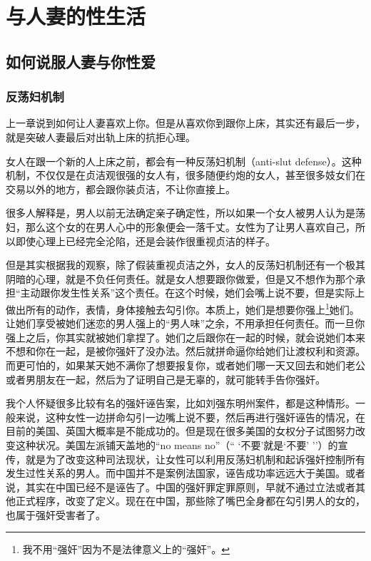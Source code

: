 \chapter{与人妻的性生活}

\section{如何说服人妻与你性爱}

\subsection{反荡妇机制}

上一章说到如何让人妻喜欢上你。但是从喜欢你到跟你上床，其实还有最后一步，就是突破人妻最后对出轨上床的抗拒心理。

女人在跟一个新的人上床之前，都会有一种反荡妇机制（anti-slut defense）。这种机制，不仅仅是在贞洁观很强的女人有，很多随便约炮的女人，甚至很多妓女们在交易以外的地方，都会跟你装贞洁，不让你直接上。

很多人解释是，男人以前无法确定亲子确定性，所以如果一个女人被男人认为是荡妇，那么这个女的在男人心中的形象便会一落千丈。女性为了让男人喜欢自己，所以即使心理上已经完全沦陷，还是会装作很重视贞洁的样子。

但是其实根据我的观察，除了假装重视贞洁之外，女人的反荡妇机制还有一个极其阴暗的心理，就是不负任何责任。就是女人想要跟你做爱，但是又不想作为那个承担``主动跟你发生性关系''这个责任。在这个时候，她们会嘴上说不要，但是实际上做出所有的动作，表情，身体接触去勾引你。本质上，她们是想要你强上\footnote{我不用``强奸''因为不是法律意义上的``强奸''。}她们。让她们享受被她们迷恋的男人强上的``男人味''之余，不用承担任何责任。而一旦你强上之后，你其实就被她们拿捏了。她们之后跟你在一起的时候，就会说她们本来不想和你在一起，是被你强奸了没办法。然后就拼命逼你给她们让渡权利和资源。而更可怕的，如果某天她不满你了想要报复你，或者她们哪一天又回去和她们老公或者男朋友在一起，然后为了证明自己是无辜的，就可能转手告你强奸。

我个人怀疑很多比较有名的强奸诬告案，比如刘强东明州案件，都是这种情形。一般来说，这种女性一边拼命勾引一边嘴上说不要，然后再进行强奸诬告的情况，在目前的美国、英国大概率是不能成功的。但是现在很多美国的女权分子试图努力改变这种状况。美国左派铺天盖地的``no means no''（`` `不要'就是`不要' ''）的宣传，就是为了改变这种司法现状，让女性可以利用反荡妇机制和起诉强奸控制所有发生过性关系的男人。而中国并不是案例法国家，诬告成功率远远大于美国。或者说，其实在中国已经不是诬告了。中国的强奸罪定罪原则，早就不通过立法或者其他正式程序，改变了定义。现在在中国，那些除了嘴巴全身都在勾引男人的女的，也属于强奸受害者了。

